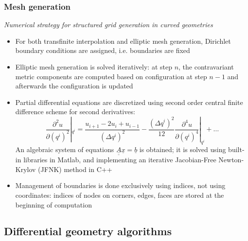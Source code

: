 \documentclass[first,firstsupp,lastsupp,handout,last,hyperref,table]{ETHclass}
\begin{document}
\begin{frame}[label=linear_system]
\frametitle{Mesh generation}
\vspace{-0.4cm}
\centering
{\footnotesize
\textit{Numerical strategy for structured grid generation in curved geometries  \hyperlink{num_stra}{}}
}
\begin{itemize}
\item {\scriptsize For both transfinite interpolation and elliptic mesh generation, Dirichlet boundary conditions are assigned, i.e. boundaries are fixed}
\item {\scriptsize Elliptic mesh generation is solved iteratively: at step $n$, the contravariant metric components are computed based on configuration at step $n-1$ and afterwards the configuration is updated}
\item {\scriptsize Partial differential equations are discretized using second order central finite difference scheme for second derivatives:}
{\scriptsize
\begin{equation*}
\frac{\partial^{2} u}{\partial (q^{i})^{2}}|_{q^{i}}=\frac{u_{i+1}-2u_{i}+u_{i-1}}{(\Delta q^{i})^{2}}-\frac{(\Delta q^{i})^{2}}{12}\frac{\partial^{4} u}{\partial (q^{i})^{4}}|_{q^{i}}+\dots
\end{equation*}
}
{\scriptsize An algebraic system of equations $\underline{\underline{A}}\underline{x}=\underline{b}$ is obtained; it is solved using built-in libraries in Matlab, and implementing an iterative Jacobian-Free Newton-Krylov (JFNK) method in C++}
\item {\scriptsize Management of boundaries is done exclusively using indices, not using coordinates: indices of nodes on corners, edges, faces are stored at the beginning of computation}
\end{itemize}
\end{frame}

\subsection{Differential geometry algorithms}
\end{document}
